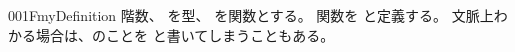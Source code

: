 \documentclass[index]{subfiles}
\begin{document}
\begin{myBlock}{001F}{myDefinition}
  階数、
  を型、
  を関数とする。
  関数を
  と定義する。
  文脈上わかる場合は、のことを
  と書いてしまうこともある。
\end{myBlock}
\end{document}
